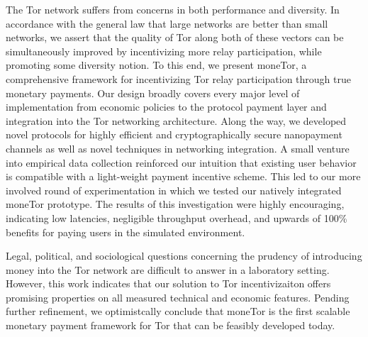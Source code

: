 The Tor network suffers from concerns in both performance and diversity. In
accordance with the general law that large networks are better than small
networks, we assert that the quality of Tor along both of these vectors can be
simultaneously improved by incentivizing more relay participation, while
promoting some diversity notion. To this end, we present moneTor, a
comprehensive framework for incentivizing Tor relay participation through true
monetary payments. Our design broadly covers every major level of implementation
from economic policies to the protocol payment layer and integration into the
Tor networking architecture. Along the way, we developed novel protocols for
highly efficient and cryptographically secure nanopayment channels as well as
novel techniques in networking integration. A small venture into empirical data
collection reinforced our intuition that existing user behavior is compatible
with a light-weight payment incentive scheme. This led to our more involved
round of experimentation in which we tested our natively integrated moneTor
prototype. The results of this investigation were highly encouraging, indicating
low latencies, negligible throughput overhead, and upwards of 100\% benefits for
paying users in the simulated environment.

Legal, political, and sociological questions concerning the prudency of
introducing money into the Tor network are difficult to answer in a laboratory
setting. However, this work indicates that our solution to Tor incentivizaiton
offers promising properties on all measured technical and economic
features. Pending further refinement, we optimistcally conclude that moneTor is
the first scalable monetary payment framework for Tor that can be feasibly
developed today.